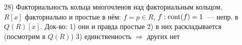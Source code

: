 28) Факториальность кольца многочленов над факториальным кольцом.\\
$R[x]$ факториально и простые в нём: $f = p \in R$, $f: \operatorname{cont}(f) = 1$~--- непр. в $Q(R)[x]$. Док-во: 1) они и правда простые 2) в них раскладывается (посмотрим в $Q(R)$) 3) единственность $\Rightarrow$ других нет\\
